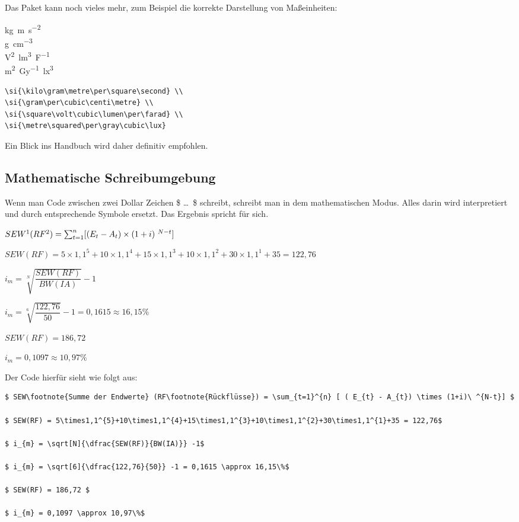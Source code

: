 Das Paket kann noch vieles mehr, zum Beispiel die korrekte Darstellung von Maßeinheiten:

\si{\kilo\gram\metre\per\square\second} \\
\si{\gram\per\cubic\centi\metre} \\
\si{\square\volt\cubic\lumen\per\farad} \\
\si{\metre\squared\per\gray\cubic\lux}

\begin{lstlisting}[float=htb,caption=Darstellung von Einheiten mit siunitx,label=lst:einheiten]
\si{\kilo\gram\metre\per\square\second} \\
\si{\gram\per\cubic\centi\metre} \\
\si{\square\volt\cubic\lumen\per\farad} \\
\si{\metre\squared\per\gray\cubic\lux}
\end{lstlisting}

Ein Blick ins Handbuch wird daher definitiv empfohlen.
\subsection{Mathematische Schreibumgebung}%
\label{sec:math-umg}
Wenn man Code zwischen zwei Dollar Zeichen \$ \dots\ \$ schreibt, schreibt man in dem mathematischen Modus. Alles darin wird interpretiert und durch entsprechende Symbole ersetzt. Das Ergebnis spricht für sich.

$ SEW\footnote{Summe der Endwerte} (RF\footnote{Rückflüsse}) = \sum_{t=1}^{n} [ ( E_{t} - A_{t}) \times (1+i)\ ^{N-t}] $

$ SEW(RF) = 5\times1,1^{5}+10\times1,1^{4}+15\times1,1^{3}+10\times1,1^{2}+30\times1,1^{1}+35 = 122,76$

$ i_{m} = \sqrt[N]{\dfrac{SEW(RF)}{BW(IA)}} -1$

$ i_{m} = \sqrt[6]{\dfrac{122,76}{50}} -1 = 0,1615 \approx 16,15\%$

$ SEW(RF) = 186,72 $

$ i_{m} = 0,1097 \approx 10,97\%$

Der Code hierfür sieht wie folgt aus:
\begin{lstlisting}[float=htb,caption=Darstellungen von mathematischen Formeln,label=lst:inlinemath]
$ SEW\footnote{Summe der Endwerte} (RF\footnote{Rückflüsse}) = \sum_{t=1}^{n} [ ( E_{t} - A_{t}) \times (1+i)\ ^{N-t}] $

$ SEW(RF) = 5\times1,1^{5}+10\times1,1^{4}+15\times1,1^{3}+10\times1,1^{2}+30\times1,1^{1}+35 = 122,76$

$ i_{m} = \sqrt[N]{\dfrac{SEW(RF)}{BW(IA)}} -1$

$ i_{m} = \sqrt[6]{\dfrac{122,76}{50}} -1 = 0,1615 \approx 16,15\%$

$ SEW(RF) = 186,72 $

$ i_{m} = 0,1097 \approx 10,97\%$
\end{lstlisting}

